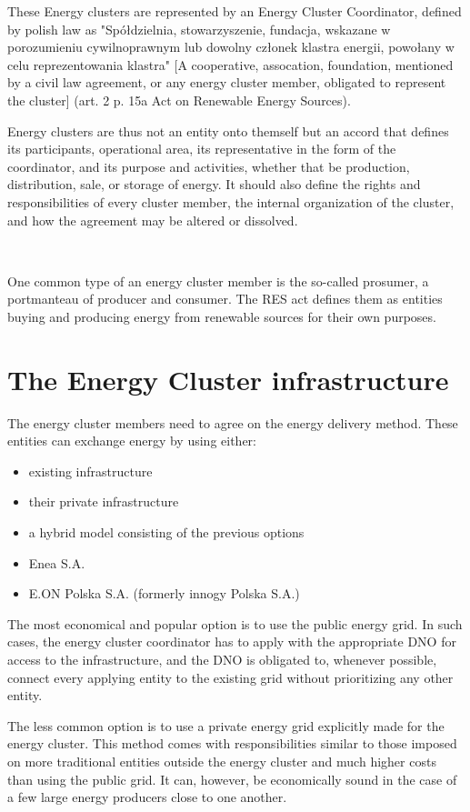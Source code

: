 \par These Energy clusters are represented by an Energy Cluster Coordinator, defined by polish law as "Spółdzielnia, stowarzyszenie, fundacja, wskazane w porozumieniu cywilnoprawnym lub dowolny członek klastra energii, powołany w celu reprezentowania klastra" [A cooperative, assocation, foundation, mentioned by a civil law agreement, or any energy cluster member, obligated to represent the cluster] (art. 2 p. 15a Act on Renewable Energy Sources).
\par Energy clusters are thus not an entity onto themself but an accord that defines its participants, operational area, its representative in the form of the coordinator, and its purpose and activities, whether that be production, distribution, sale, or storage of energy. It should also define the rights and responsibilities of every cluster member, the internal organization of the cluster, and how the agreement may be altered or dissolved. 
\par ~
\par One common type of an energy cluster member is the so-called prosumer, a portmanteau of producer and consumer. The RES act defines them as entities buying and producing energy from renewable sources for their own purposes. 

\section{The Energy Cluster infrastructure}

\par The energy cluster members need to agree on the energy delivery method. These entities can exchange energy by using either: 
\begin{itemize}
  \item existing infrastructure
  \item their private infrastructure
  \item a hybrid model consisting of the previous options
  \item Enea S.A.
  \item E.ON Polska S.A. (formerly innogy Polska S.A.)
\end{itemize}
\par The most economical and popular option is to use the public energy grid. In such cases, the energy cluster coordinator has to apply with the appropriate DNO for access to the infrastructure, and the DNO is obligated to, whenever possible, connect every applying entity to the existing grid without prioritizing any other entity.
\par The less common option is to use a private energy grid explicitly made for the energy cluster. This method comes with responsibilities similar to those imposed on more traditional entities outside the energy cluster and much higher costs than using the public grid. It can, however, be economically sound in the case of a few large energy producers close to one another.

